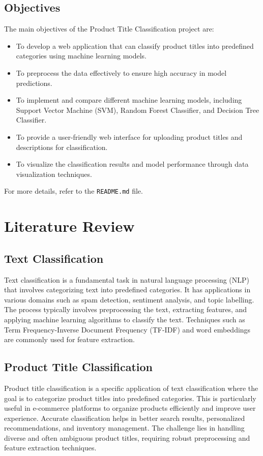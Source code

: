 \documentclass[10pt]{article}
\begin{document}
\subsection{Objectives}
The main objectives of the Product Title Classification project are:
\begin{itemize}
    \item To develop a web application that can classify product titles into predefined categories using machine learning models.
    \item To preprocess the data effectively to ensure high accuracy in model predictions.
    \item To implement and compare different machine learning models, including Support Vector Machine (SVM), Random Forest Classifier, and Decision Tree Classifier.
    \item To provide a user-friendly web interface for uploading product titles and descriptions for classification.
    \item To visualize the classification results and model performance through data visualization techniques.
\end{itemize}

For more details, refer to the \texttt{README.md} file.

\section{Literature Review}

\subsection{Text Classification}
Text classification is a fundamental task in natural language processing (NLP) that involves categorizing text into predefined categories. It has applications in various domains such as spam detection, sentiment analysis, and topic labelling. The process typically involves preprocessing the text, extracting features, and applying machine learning algorithms to classify the text. Techniques such as Term Frequency-Inverse Document Frequency (TF-IDF) and word embeddings are commonly used for feature extraction.

\subsection{Product Title Classification}
Product title classification is a specific application of text classification where the goal is to categorize product titles into predefined categories. This is particularly useful in e-commerce platforms to organize products efficiently and improve user experience. Accurate classification helps in better search results, personalized recommendations, and inventory management. The challenge lies in handling diverse and often ambiguous product titles, requiring robust preprocessing and feature extraction techniques.
\end{document}
